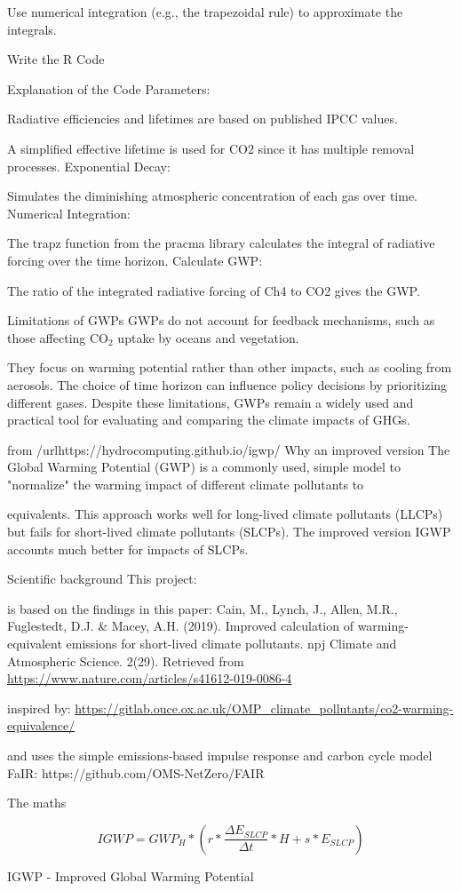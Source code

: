 \documentclass{tufte-handout}\usepackage[]{graphicx}\usepackage[]{xcolor}
\begin{document}
Use numerical integration (e.g., the trapezoidal rule) to approximate the integrals.

Write the R Code


Explanation of the Code
Parameters:

Radiative efficiencies and lifetimes are based on published IPCC values.

A simplified effective lifetime is used for CO2 since it has multiple removal processes.
Exponential Decay:

Simulates the diminishing atmospheric concentration of each gas over time.
Numerical Integration:

The trapz function from the pracma library calculates the integral of radiative forcing over the time horizon.
Calculate GWP:

The ratio of the integrated radiative forcing of Ch4 to CO2 gives the GWP.


Limitations of GWPs
GWPs do not account for feedback mechanisms, such as those affecting CO$_2$ uptake by oceans and vegetation.


They focus on warming potential rather than other impacts, such as cooling from aerosols.
The choice of time horizon can influence policy decisions by prioritizing different gases.
Despite these limitations, GWPs remain a widely used and practical tool for evaluating and comparing the climate impacts of GHGs.

from /url{https://hydrocomputing.github.io/igwp/}
Why an improved version
The Global Warming Potential (GWP) is a commonly used, simple model to "normalize" the warming impact of different climate pollutants to 

  equivalents. This approach works well for long-lived climate pollutants (LLCPs) but fails for short-lived climate pollutants (SLCPs). The improved version IGWP accounts much better for impacts of SLCPs.

Scientific background
This project:

is based on the findings in this paper: Cain, M., Lynch, J., Allen, M.R., Fuglestedt, D.J. \& Macey, A.H. (2019). Improved calculation of warming- equivalent emissions for short-lived climate pollutants. npj Climate and Atmospheric Science. 2(29). Retrieved from \url{https://www.nature.com/articles/s41612-019-0086-4}

inspired by: \url{https://gitlab.ouce.ox.ac.uk/OMP_climate_pollutants/co2-warming-equivalence/}

and uses the simple emissions-based impulse response and carbon cycle model FaIR: https://github.com/OMS-NetZero/FAIR

The maths

\begin{equation}
IGWP = GWP_H * (r * \frac{\Delta E_{SLCP}}{\Delta t}*H + s * E_{SLCP})
\end{equation}


IGWP - Improved Global Warming Potential

	
\end{document}
